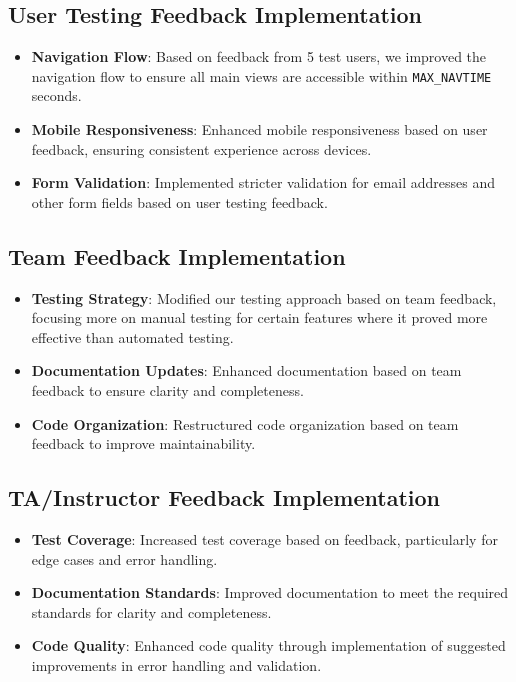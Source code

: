 \documentclass[12pt, titlepage]{article}
\begin{document}
\subsection{User Testing Feedback Implementation}

\begin{itemize}
    \item \textbf{Navigation Flow}: Based on feedback from 5 test users, we improved the navigation flow to ensure all main views are accessible within \texttt{MAX\_NAVTIME} seconds.
    \item \textbf{Mobile Responsiveness}: Enhanced mobile responsiveness based on user feedback, ensuring consistent experience across devices.
    \item \textbf{Form Validation}: Implemented stricter validation for email addresses and other form fields based on user testing feedback.
\end{itemize}

\subsection{Team Feedback Implementation}

\begin{itemize}
    \item \textbf{Testing Strategy}: Modified our testing approach based on team feedback, focusing more on manual testing for certain features where it proved more effective than automated testing.
    \item \textbf{Documentation Updates}: Enhanced documentation based on team feedback to ensure clarity and completeness.
    \item \textbf{Code Organization}: Restructured code organization based on team feedback to improve maintainability.
\end{itemize}

\subsection{TA/Instructor Feedback Implementation}

\begin{itemize}
    \item \textbf{Test Coverage}: Increased test coverage based on feedback, particularly for edge cases and error handling.
    \item \textbf{Documentation Standards}: Improved documentation to meet the required standards for clarity and completeness.
    \item \textbf{Code Quality}: Enhanced code quality through implementation of suggested improvements in error handling and validation.
\end{itemize}
\end{document}

